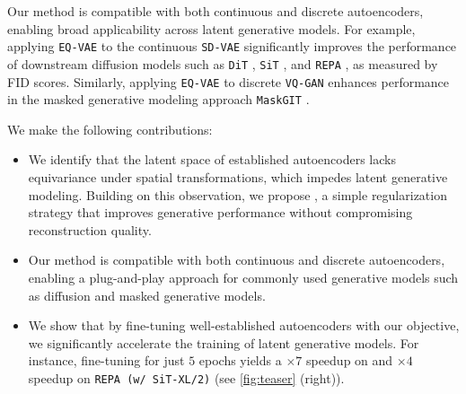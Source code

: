 Our method is compatible with both continuous and discrete autoencoders, enabling broad applicability across latent generative models. For example, applying \texttt{EQ-VAE} to the continuous \texttt{SD-VAE} \cite{rombach2022high} significantly improves the performance of downstream diffusion models such as \texttt{DiT} \cite{peebles2023scalable}, \texttt{SiT} \cite{ma2024sit}, and \texttt{REPA} \cite{Yu2025repa}, as measured by FID scores. 
Similarly, applying \texttt{EQ-VAE} to discrete \texttt{VQ-GAN} \cite{esser2021taming} enhances performance in the masked generative modeling approach \texttt{MaskGIT} \cite{chang2022maskgit}.

We make the following contributions:
\begin{itemize}[noitemsep,topsep=0pt]
    \item We identify that the latent space of established autoencoders lacks equivariance under spatial transformations, which impedes latent generative modeling. Building on this observation, we propose \our, a simple regularization strategy that improves generative performance without compromising reconstruction quality.  
    \item Our method is compatible with both continuous and discrete autoencoders, enabling a plug-and-play approach for commonly used generative models such as diffusion and masked generative models.
    \item 
    We show that by fine-tuning well-established autoencoders with our objective,
    we significantly accelerate the training of latent generative models. For instance, fine-tuning \sdvae for just $5$ epochs yields a $\times 7$ speedup on \ditxltwo and  $\times 4$ speedup on \texttt{REPA (w/ SiT-XL/2)} (see \autoref{fig:teaser} (right)).
\end{itemize}